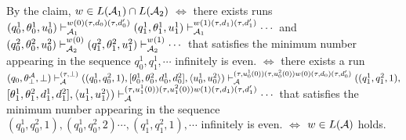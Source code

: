 By the claim,
$w\in L({\cal A}_1)\cap L({\cal A}_2)$
$\Leftrightarrow$
there exists runs
$(q_0^1,\theta^1_0,u^1_0)\vdash_{{\cal A}_1}^{w(0)(\tau,d_0)(\tau,d'_0)}
(q_1^1,\theta^1_1,u^1_1)\vdash_{{\cal A}_1}^{w(1)(\tau,d_1)(\tau,d'_1)} \cdots$ and
$(q_0^2,\theta^2_0,u^2_0)\vdash_{{\cal A}_2}^{w(0)}
(q_1^2,\theta^2_1,u^2_1)\vdash_{{\cal A}_2}^{w(1)} \cdots$
that satisfies the minimum number appearing in
the sequence $q^1_0, q^1_1, \cdots$ infinitely is even.
$\Leftrightarrow$
there exists a run
$(q_0, \theta^{\cal A}_\bot, \bot)
\vdash_{\cal A}^{(\tau,\bot)}
((q^1_0,q^2_0,1),[\theta^1_0,\theta^2_0,d^1_0,d^2_0],\langle u^1_0,u^2_0\rangle)
\vdash_{\cal A}^{(\tau,u^1_0(0))(\tau,u^2_0(0))w(0)(\tau,d_0)(\tau,d'_0)}
((q^1_1,q^2_1,1),$
\\
$[\theta^1_1,\theta^2_1,d^1_1,d^2_1],\langle u^1_1,u^2_1\rangle)
\vdash_{\cal A}^{(\tau,u^1_1(0))(\tau,u^2_1(0))w(1)(\tau,d_1)(\tau,d'_1)}
\cdots$
that satisfies the minimum number appearing in
the sequence $(q^1_0,q^2_0,1), (q^1_0,q^2_0,2) \cdots, (q^1_1,q^2_1,1), \cdots$ infinitely is even.
$\Leftrightarrow$
$w\in L({\cal A})$ holds.
